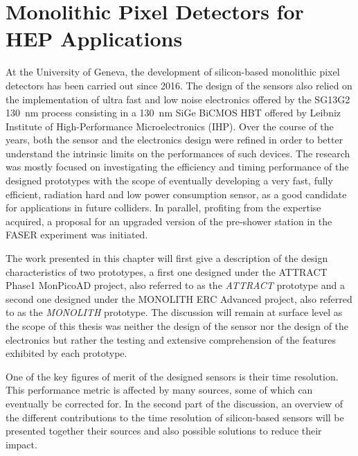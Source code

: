 \chapter{Monolithic Pixel Detectors for HEP Applications}


At the University of Geneva, the development of silicon-based monolithic pixel detectors has been carried out since 2016. The design of the sensors also relied on the implementation of ultra fast and low noise electronics offered by the SG13G2 \SI{130}{\nano\meter} process \cite{IHP130nm} consisting in a \SI{130}{nm} SiGe BiCMOS HBT offered by Leibniz Institute of High-Performance Microelectronics (IHP). Over the course of the years, both the sensor and the electronics design were refined in order to better understand the intrinsic limits on the performances of such devices. The research was mostly focused on investigating the efficiency and timing performance of the designed prototypes with the scope of eventually developing a very fast, fully efficient, radiation hard and low power consumption sensor, as a good candidate for applications in future colliders. In parallel, profiting from the expertise acquired, a proposal for an upgraded version of the pre-shower station in the FASER experiment was initiated.

The work presented in this chapter will first give a description of the design characteristics of two prototypes, a first one designed under the ATTRACT Phase1 MonPicoAD project, also referred to as the \textit{ATTRACT} prototype and a second one designed under the MONOLITH ERC Advanced project, also referred to as the \textit{MONOLITH} prototype. The discussion will remain at surface level as the scope of this thesis was neither the design of the sensor nor the design of the electronics but rather the testing and extensive comprehension of the features exhibited by each prototype.

One of the key figures of merit of the designed sensors is their time resolution. This performance metric is affected by many sources, some of which can eventually be corrected for. In the second part of the discussion, an overview of the different contributions to the time resolution of silicon-based sensors will be presented together their sources and also possible solutions to reduce their impact. 

